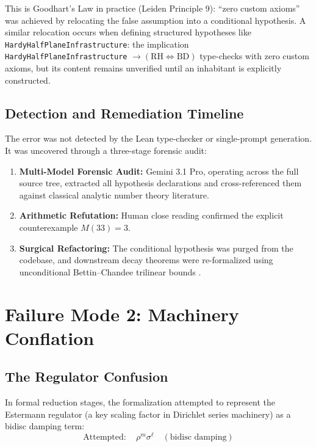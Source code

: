 \documentclass[11pt,a4paper]{article}
\theoremstyle{definition}
\theoremstyle{remark}
\begin{document}
This is Goodhart's Law in practice (Leiden Principle 9): ``zero custom axioms'' was achieved by relocating the false assumption into a conditional hypothesis. A similar relocation occurs when defining structured hypotheses like \texttt{HardyHalfPlaneInfrastructure}: the implication \texttt{HardyHalfPlaneInfrastructure} $\to (\text{RH} \iff \text{BD})$ type-checks with zero custom axioms, but its content remains unverified until an inhabitant is explicitly constructed.

\subsection{Detection and Remediation Timeline}

The error was not detected by the Lean type-checker or single-prompt generation. It was uncovered through a three-stage forensic audit:
\begin{enumerate}[label=(\roman*)]
  \item \textbf{Multi-Model Forensic Audit:} Gemini 3.1 Pro, operating across the full source tree, extracted all hypothesis declarations and cross-referenced them against classical analytic number theory literature.
  \item \textbf{Arithmetic Refutation:} Human close reading confirmed the explicit counterexample $M(33) = 3$.
  \item \textbf{Surgical Refactoring:} The conditional hypothesis was purged from the codebase, and downstream decay theorems were re-formalized using unconditional Bettin--Chandee trilinear bounds \cite{BettinChandee2015}.
\end{enumerate}

\section{Failure Mode 2: Machinery Conflation}
\label{sec:failure2}

\subsection{The Regulator Confusion}

In formal reduction stages, the formalization attempted to represent the Estermann regulator (a key scaling factor in Dirichlet series machinery) as a bidisc damping term:
\[
\text{Attempted}: \quad \rho^m \sigma^\ell \quad (\text{bidisc damping})
\]
\end{document}
